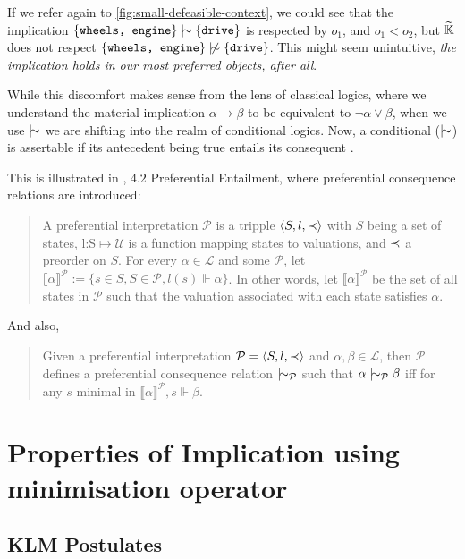 \documentclass[11pt]{article}
\begin{document}
If we refer again to \autoref{fig:small-defeasible-context}, we could see that the implication $\{\texttt{wheels, engine}\} \twiddle \{\texttt{drive}\}$ is respected by $o_1$, and $o_1 < o_2$, but $\widetilde{\mathbb{K}}$ does not respect $\{\texttt{wheels, engine}\} \ntwiddle \{\texttt{drive}\}$. This might seem unintuitive, \textit{the implication holds in our most preferred objects, after all}.

While this discomfort makes sense from the lens of classical logics, where we understand the material implication $\alpha \rightarrow \beta$ to be equivalent to $\neg \alpha \lor \beta$, when we use $\twiddle$ we are shifting into the realm of conditional logics. Now, a conditional ($\twiddle$) is assertable if its antecedent being true entails its consequent \cite{sep-logic-conditionals}.

This is illustrated in \cite{kaliski2020overview}, $4.2$ Preferential Entailment, where preferential consequence relations are introduced:
\begin{quotation}
  A preferential interpretation $\mathcal{P}$ is a tripple $\langle S, l, \prec \rangle$ with $S$ being a set of states, l:S$\mapsto \mathcal{U}$ is a function mapping states to valuations, and $\prec$ a preorder on $S$. For every $\alpha \in \mathcal{L}$ and some $\mathcal{P}$, let $\llbracket \alpha \rrbracket^{\mathcal{P}}:= \{s\in S, S\in \mathcal{P}, l(s) \Vdash \alpha\}$. In other words, let $\llbracket \alpha \rrbracket^{\mathcal{P}}$ be the set of all states in $\mathcal{P}$ such that the valuation associated with each state satisfies $\alpha$.
\end{quotation}

And also,
\begin{quotation}
  Given a preferential interpretation $\mathcal{P} = \langle S, l, \prec \rangle$ and $\alpha, \beta \in \mathcal{L}$, then $\mathcal{P}$ defines a preferential consequence relation $\twiddle_{\mathcal{P}}$ such that $\alpha \twiddle_{\mathcal{P}} \beta$ iff for any $s$ minimal in $\llbracket \alpha \rrbracket^{\mathcal{P}}, s \Vdash \beta$.
\end{quotation}

\section{Properties of Implication using minimisation operator}
\subsection{KLM Postulates}
\end{document}

